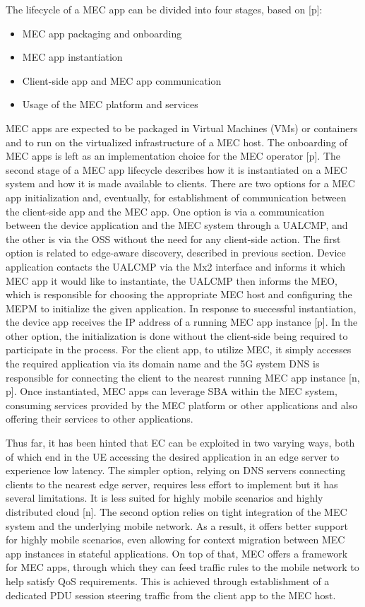 \documentclass[12pt,a4paper,twoside]{report}
\begin{document}
The lifecycle of a MEC app can be divided into four stages, based on [p]:
\begin{itemize}
	\item MEC app packaging and onboarding
	\item MEC app instantiation 
	\item Client-side app and MEC app communication 
	\item Usage of the MEC platform and services 
\end{itemize}
MEC apps are expected to be packaged in Virtual Machines (VMs) or containers and to run on the virtualized infrastructure of a MEC host. The onboarding of MEC apps is left as an implementation choice for the MEC operator [p]. The second stage of a MEC app lifecycle describes how it is instantiated on a MEC system and how it is made available to clients. There are two options for a MEC app initialization and, eventually, for establishment of communication between the client-side app and the MEC app. One option is via a communication between the device application and the MEC system through a UALCMP, and the other is via the OSS without the need for any client-side action. The first option is related to edge-aware discovery, described in previous section. Device application contacts the UALCMP via the Mx2 interface and informs it which MEC app it would like to instantiate, the UALCMP then informs the MEO, which is responsible for choosing the appropriate MEC host and configuring the MEPM to initialize the given application. In response to successful instantiation, the device app receives the IP address of a running MEC app instance [p]. In the other option, the initialization is done without the client-side being required to participate in the process. For the client app, to utilize MEC, it simply accesses the required application via its domain name and the 5G system DNS is responsible for connecting the client to the nearest running MEC app instance [n, p]. Once instantiated, MEC apps can leverage SBA within the MEC system, consuming services provided by the MEC platform or other applications and also offering their services to other applications. 

Thus far, it has been hinted that EC can be exploited in two varying ways, both of which end in the UE accessing the desired application in an edge server to experience low latency. The simpler option, relying on DNS servers connecting clients to the nearest edge server, requires less effort to implement but it has several limitations. It is less suited for highly mobile scenarios and highly distributed cloud [n]. The second option relies on tight integration of the MEC system and the underlying mobile network. As a result, it offers better support for highly mobile scenarios, even allowing for context migration between MEC app instances in stateful applications. On top of that, MEC offers a framework for MEC apps, through which they can feed traffic rules to the mobile network to help satisfy QoS requirements. This is achieved through establishment of a dedicated PDU session steering traffic from the client app to the MEC host. 
\end{document}
